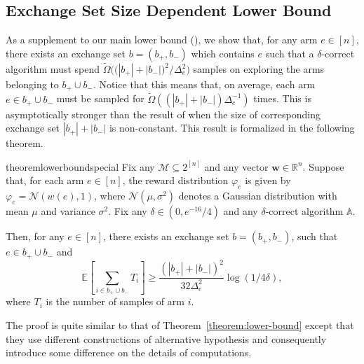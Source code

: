 \documentclass{article}
\newcommand{\Rew}{\varphi}
\newcommand{\E}{\mathbb E}
\newcommand{\M}{\mathcal M}
\newcommand{\RR}{\mathbb R}
\newcommand{\Bopt}{\mathcal B_{\mathsf{opt}}}
\renewcommand{\vec}[1]{\boldsymbol{#1}}
\begin{document}
\subsection{Exchange Set Size Dependent Lower Bound}
\label{section:lowerbound-evidence}
As a supplement to our main lower bound (), we show that, for any arm $e\in [n]$, there exists an exchange set $b=(b_+,b_-)$ which contains $e$ such that a $\delta$-correct algorithm must spend
$\tilde \Omega\Big(\big(|b_+|+|b_-|\big)^2 / \Delta_e^2 \Big)$ samples on exploring the arms belonging to $b_+\cup b_-$.
Notice that this means that, on average, each arm $e\in b_+ \cup b_-$ must be sampled for $\tilde \Omega( (|b_+|+|b_-|) \Delta_e^{-1})$ times.
This is asymptotically stronger than the result of  when the size of corresponding exchange set $|b_+|+|b_-|$ is non-constant.
This result is formalized in the following theorem.

\begin{restatable}{theorem}{lowerboundspecial}
\label{theorem:lowerboundspecial}
Fix any $\M\subseteq 2^{[n]}$ and any vector $\vec w \in \RR^n$.
Suppose that, for each arm $e\in [n]$, the reward distribution $\Rew_e$ is given by $\Rew_e=\mathcal N(w(e),1)$, where $\mathcal N(\mu, \sigma^2)$ denotes a Gaussian distribution with mean $\mu$ and variance $\sigma^2$. 
Fix any $\delta \in (0,e^{-16}/4)$
and any $\delta$-correct algorithm $\mathbb A$.

Then, for any $e\in [n]$, there exists an exchange set $b=(b_+,b_-)$, such that $e\in b_+ \cup b_-$ and
$$
\E\left[\sum_{i\in b_+\cup b_-} T_i\right] \ge \frac{(|b_+|+|b_-|)^2}{32\Delta_e^2}\log(1/4\delta),
$$
where $T_i$ is the number of samples of arm $i$.
\end{restatable}
The proof is quite similar to that of Theorem~\ref{theorem:lower-bound} except that they use different constructions of alternative hypothesis and consequently introduce some difference on the details of computations.
\end{document}

